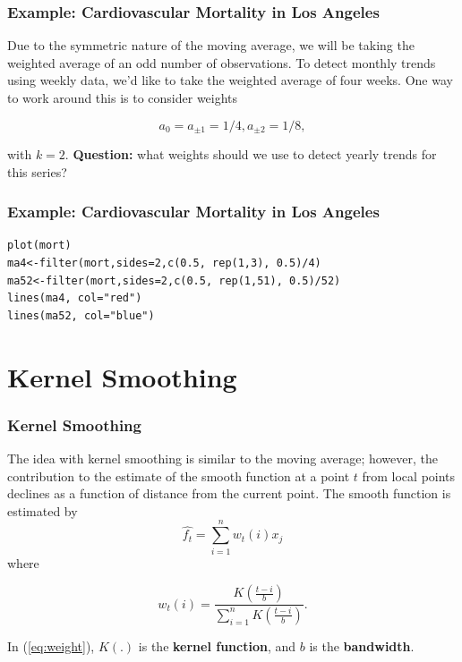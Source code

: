 \documentclass[%
xcolor=pdftex]{beamer}
\begin{document}
\begin{frame}
\frametitle{Example: Cardiovascular Mortality in Los Angeles}

Due to the symmetric nature of the moving average, we will be taking the weighted average of an odd number of observations. To detect monthly trends using weekly data, we'd like to take the weighted average of four weeks. One way to work around this is to consider weights

$$
a_0 = a_{\pm1} = 1/4, a_{\pm2} = 1/8,
$$

with $k=2$. \textbf{Question:} what weights should we use to detect yearly trends for this series?

\end{frame}

\begin{frame}[fragile]
\frametitle{Example: Cardiovascular Mortality in Los Angeles}

\begin{verbatim}
plot(mort)
ma4<-filter(mort,sides=2,c(0.5, rep(1,3), 0.5)/4)
ma52<-filter(mort,sides=2,c(0.5, rep(1,51), 0.5)/52)
lines(ma4, col="red")
lines(ma52, col="blue")
\end{verbatim}

\end{frame}

\section{Kernel Smoothing}
\frame{\tableofcontents[currentsection]}

\begin{frame}
\frametitle{Kernel Smoothing}

The idea with kernel smoothing is similar to the moving average; however, the contribution to the estimate of the smooth function at a point $t$ from local points declines as a function of distance from the current point.  The smooth function is estimated by
\begin{equation}
\hat{f_t}=\sum_{i=1}^n w_t(i) x_j
\end{equation}
where

\begin{equation} \label{eq:weight}
w_t(i)=\frac{K\left( \frac{t-i}{b} \right)}{ \sum_{i=1}^n K\left( \frac{t-i}{b} \right)}.
\end{equation}

In (\ref{eq:weight}), $K(.)$ is the \textbf{kernel function}, and $b$ is the \textbf{bandwidth}.

\end{frame}
\end{document}
